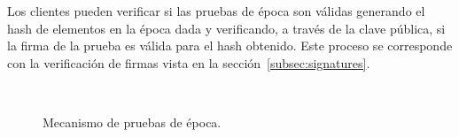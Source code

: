 Los clientes pueden verificar si las pruebas de época son válidas generando el hash de elementos
en la época dada y verificando, a través de la clave pública, si la firma de la prueba es válida
para el hash obtenido. Este proceso se corresponde con la verificación de firmas vista en la
sección~\ref{subsec:signatures}.

\begin{figure}
  \centering
  \hspace{0.5in}
  \\
  \vspace{0.25in}
  \hspace{0.5in}
  \caption{Mecanismo de pruebas de época.}
  \label{fig:epoch-proof}
\end{figure}

